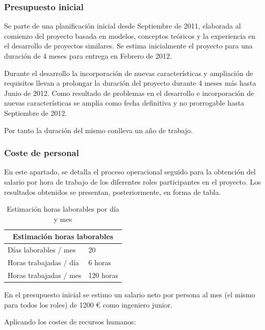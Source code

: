 \subsubsection{Presupuesto inicial}

Se parte de una planificación inicial desde Septiembre de 2011, elaborada al
comienzo del proyecto basada en modelos, conceptos teóricos y la experiencia en el 
desarrollo de proyectos similares. Se estima inicialmente el proyecto para una
duración de 4 meses para entrega en Febrero de 2012.

Durante el desarrollo la incorporación de nuevas características y ampliación de
requisitos llevan a prolongar la duración del proyecto durante 4 meses más
hasta Junio de 2012. Como resultado de problemas en el desarrollo e
incorporación de nuevas características se amplía como fecha definitiva y no
prorrogable hasta Septiembre de 2012. 

Por tanto la duración del mismo conlleva
un año de trabajo.

\newpage

\subsubsection{Coste de personal}

En este apartado, se detalla el proceso operacional seguido para la 
obtención del salario por hora de trabajo de los diferentes roles 
participantes en el proyecto. Los resultados obtenidos se presentan,
posteriormente, en forma de tabla.

\begin{table}[ht]
    \centering
    \begin{tabular}{|l|l|}
      \hline
      \multicolumn{2}{|c|}{Estimación horas laborables} \\
      \hline
        Días laborables / mes &  20 \\
        Horas trabajadas / día & 6 horas \\
        Horas trabajadas / mes & 120 horas \\
      \hline
    \end{tabular}
    \caption{Estimación horas laborables por día y mes}
     \label{tab:hourestimation}
\end{table}

En el presupuesto inicial se estimo un salario neto por persona al mes (el
mismo para todos los roles) de 1200 € como ingeniero junior.

Aplicando los costes de recursos humanos:

